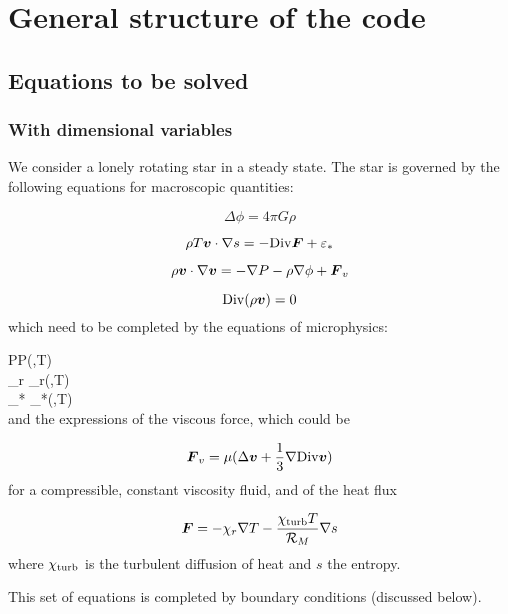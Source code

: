 \chapter{General structure of the code}


\section{Equations to be solved}

\subsection{With dimensional variables}

We consider a lonely rotating star in a steady state. The star is
governed by the following equations for macroscopic quantities:

\begin{equation} \Delta\phi = 4\pi G\rho\end{equation}

\begin{equation} \rho T \vv\cdot\nabla s = -\Div\vF + \eps_*\end{equation}

\begin{equation} \rho \vv\cdot\na\vv = -\na P -\rho\na\phi+\vF_v\end{equation}

\begin{equation} \Div(\rho\vv) =0\end{equation}
which need to be completed by the equations of microphysics:

\greq
P\equiv P(\rho,T)\\
\khi_r \equiv \khi_r(\rho,T)\\
\eps_* \equiv \eps_*(\rho,T)\\
\egreq
and the expressions of the viscous force, which could be

\begin{equation} \vF_v = \mu(\Delta\vv + \frac{1}{3}\na\Div\vv)\end{equation}
for a compressible, constant viscosity fluid, and of the heat flux

\begin{equation} \vF = -\khi_r\na T -\frac{\khi_{\rm turb}T}{{\cal R}_M}\na s\end{equation}
where $\chi_{\rm turb}$ is the turbulent diffusion of heat and $s$ the
entropy.

This set of equations is completed by boundary conditions (discussed
below).

